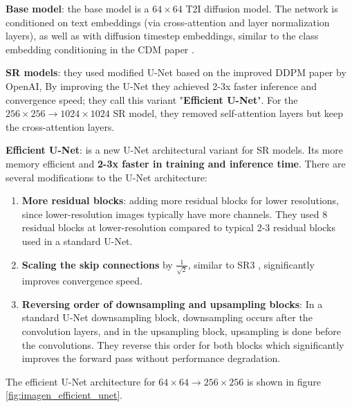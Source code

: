 \textbf{Base model}: the base model is a $64\times 64$ T2I diffusion model. The network is conditioned on text embeddings (via cross-attention and layer normalization layers), as well as with diffusion timestep embeddings, similar to the class embedding conditioning in the CDM paper \cite{cascaded_diffusion_models}.

\textbf{SR models}: they used modified U-Net based on the improved DDPM paper \cite{openai_improved_ddpm} by OpenAI, By improving the U-Net they achieved 2-3x faster inference and convergence speed; they call this variant "\textbf{Efficient U-Net}". For the $256\times 256 \rightarrow 1024\times 1024$ SR model, they removed self-attention layers but keep the cross-attention layers.

\textbf{Efficient U-Net}: is a new U-Net architectural variant for SR models. Its more memory efficient and \textbf{2-3x faster in training and inference time}. There are several modifications to the U-Net architecture:

\begin{enumerate}
    \item \textbf{More residual blocks}: adding more residual blocks for lower resolutions, since lower-resolution images typically have more channels. They used 8 residual blocks at lower-resolution compared to typical 2-3 residual blocks used in a standard U-Net.
    \item \textbf{Scaling the skip connections} by $\frac{1}{\sqrt{2}}$, similar to SR3 \cite{sr3}, significantly improves convergence speed.
    \item \textbf{Reversing order of downsampling and upsampling blocks}: In a standard U-Net downsampling block, downsampling occurs after the convolution layers, and in the upsampling block, upsampling is done before the convolutions. They reverse this order for both blocks which significantly improves the forward pass without performance degradation.
\end{enumerate}

The efficient U-Net architecture for $64\times 64 \rightarrow 256\times 256$ is shown in figure \ref{fig:imagen_efficient_unet}.

